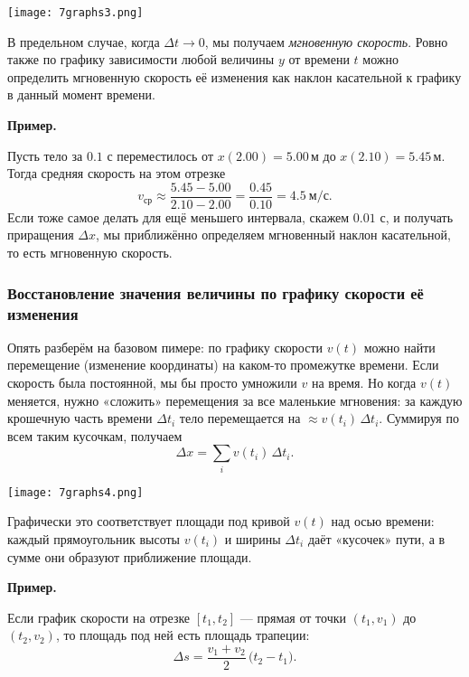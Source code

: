 \documentclass[12pt, a4paper]{article}%
\begin{document}
\begin{center}
\texttt{[image: 7graphs3.png]}
\label{fig:mpr}
\end{center}



В предельном случае, когда $\Delta t\to0$, мы получаем \textit{мгновенную скорость}. Ровно также по графику зависимости любой величины $y$ от времени $t$ можно определить мгновенную скорость её изменения как наклон касательной к графику в данный момент времени.

\textbf{Пример.}

Пусть тело за $0.1$ с переместилось от $x(2{.}00)=5{.}00\,$м до $x(2{.}10)=5{.}45\,$м. Тогда средняя скорость на этом отрезке
\[
 v_\text{ср} \approx \frac{5{.}45 - 5{.}00}{2{.}10 - 2{.}00} = \frac{0{.}45}{0{.}10} = 4{.}5\ \mathrm{м/с}.
\]
Если тоже самое делать для ещё меньшего интервала, скажем $0{.}01$ с, и получать приращения $\Delta x$, мы приближённо определяем мгновенный наклон касательной, то есть мгновенную скорость.

\subsubsection*{Восстановление значения величины по графику скорости её изменения}

Опять разберём на базовом пимере: по графику скорости $v(t)$ можно найти перемещение (изменение координаты) на каком-то промежутке времени. Если скорость была постоянной, мы бы просто умножили $v$ на время. Но когда $v(t)$ меняется, нужно «сложить» перемещения за все маленькие мгновения: за каждую крошечную часть времени $\Delta t_i$ тело перемещается на $\approx v(t_i)\,\Delta t_i$. Суммируя по всем таким кусочкам, получаем
\[
\Delta x = \sum_i v(t_i)\,\Delta t_i.
\]

\begin{center}
\texttt{[image: 7graphs4.png]}
\label{fig:mpr}
\end{center}


Графически это соответствует площади под кривой $v(t)$ над осью времени: каждый прямоугольник высоты $v(t_i)$ и ширины $\Delta t_i$ даёт «кусочек» пути, а в сумме они образуют приближение площади.

\textbf{Пример.}

Если график скорости на отрезке $[t_1,t_2]$ — прямая от точки $(t_1, v_1)$ до $(t_2,v_2)$, то площадь под ней есть площадь трапеции:
\[
\Delta s = \frac{v_1 + v_2}{2}\,\bigl(t_2 - t_1\bigr).
\]
\end{document}
